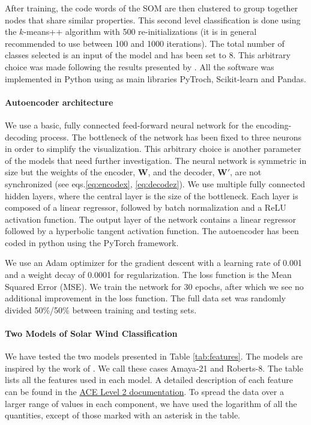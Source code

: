 After training, the code words of the SOM are then clustered to group together nodes that share similar properties. This second level classification is done using the $k$-means++ algorithm with 500 re-initializations (it is in general recommended to use between 100 and 1000 iterations). The total number of classes selected is an input of the model and has been set to 8. This arbitrary choice was made following the results presented by \citep{Roberts2020}. All the software was implemented in Python using as main libraries PyTroch, Scikit-learn and Pandas.

\paragraph{Autoencoder architecture}
We use a basic, fully connected feed-forward neural network for the encoding-decoding process. The bottleneck of the network has been fixed to three neurons in order to simplify the visualization. This arbitrary choice is another parameter of the models that need further investigation. The neural network is symmetric in size but the weights of the encoder, $\boldsymbol{W}$, and the decoder, $\boldsymbol{W'}$, are not synchronized (see eqs.\eqref{eq:encodex}, \eqref{eq:decodez}). We use multiple fully connected hidden layers, where the central layer is the size of the bottleneck. Each layer is composed of a linear regressor, followed by batch normalization and a ReLU activation function. The output layer of the network contains a linear regressor followed by a hyperbolic tangent activation function. The autoencoder has been coded in python using the PyTorch framework.

We use an Adam optimizer \citep{Kingma2014} for the gradient descent with a learning rate of 0.001 and a weight decay of 0.0001 for regularization. The loss function is the Mean Squared Error (MSE). We train the network for 30 epochs, after which we see no additional improvement in the loss function. The full data set was randomly divided 50\%/50\% between training and testing sets.

\paragraph{Two Models of Solar Wind Classification}
\label{sec:fourmodels}
We have tested the two models presented in Table \ref{tab:features}. The models are inspired by the work of \citep{Roberts2020}. We call these cases Amaya-21 and Roberts-8.  The table lists all the features used in each model. A detailed description of each feature can be found in the \href{http://www.srl.caltech.edu/cgi-bin/dib/rundibviewmultil2/ACE/ASC/DATA/level2/multi}{ACE Level 2 documentation}. To spread the data over a larger range of values in each component, we have used the logarithm of all the quantities, except of those marked with an asterisk in the table.


